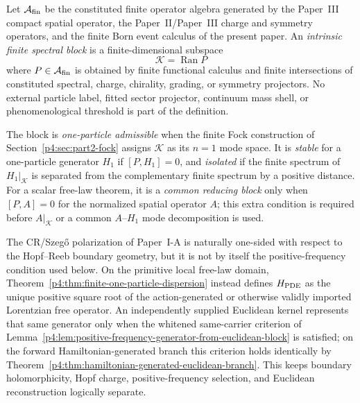 \documentclass[12pt,a4paper]{article}
\begin{document}
\begin{definition}
\label{p4:def:intrinsic-finite-spectral-block}
Let \(\mathcal A_{\rm fin}\) be the constituted finite operator algebra generated by the Paper~III compact spatial operator, the Paper~II/Paper~III charge and symmetry operators, and the finite Born event calculus of the present paper.  An \emph{intrinsic finite spectral block} is a finite-dimensional subspace
\[
  \mathcal K=\operatorname{Ran}P
\]
where \(P\in\mathcal A_{\rm fin}\) is obtained by finite functional calculus and finite intersections of constituted spectral, charge, chirality, grading, or symmetry projectors.  No external particle label, fitted sector projector, continuum mass shell, or phenomenological threshold is part of the definition.

The block is \emph{one-particle admissible} when the finite Fock construction of Section~\ref{p4:sec:part2-fock} assigns \(\mathcal K\) as its \(n=1\) mode space.  It is \emph{stable} for a one-particle generator \(H_1\) if \([P,H_1]=0\), and \emph{isolated} if the finite spectrum of \(H_1|_{\mathcal K}\) is separated from the complementary finite spectrum by a positive distance.
For a scalar free-law theorem, it is a \emph{common reducing block} only when
\([P,A]=0\) for the normalized spatial operator \(A\); this extra condition is
required before \(A|_{\mathcal K}\) or a common \(A\)--\(H_1\) mode
decomposition is used.
\end{definition}

\begin{remark}
\label{p4:rem:reeb-polarization-not-time-frequency}
\leavevmode\par\noindent
The CR/Szeg\H{o} polarization of Paper~I-A is naturally one-sided with respect to
the Hopf--Reeb boundary geometry, but it is not by itself the positive-frequency
condition used below.  On the primitive local free-law domain,
Theorem~\ref{p4:thm:finite-one-particle-dispersion} instead defines
\(H_{\rm PDE}\) as the unique positive square root of the action-generated
or otherwise validly imported Lorentzian free operator.  An independently supplied Euclidean kernel
represents that same generator only when the whitened same-carrier criterion
of Lemma~\ref{p4:lem:positive-frequency-generator-from-euclidean-block} is
satisfied; on the forward Hamiltonian-generated branch this criterion holds
identically by
Theorem~\ref{p4:thm:hamiltonian-generated-euclidean-branch}.  This keeps
boundary holomorphicity, Hopf charge, positive-frequency selection, and
Euclidean reconstruction logically separate.
\end{remark}
\end{document}
